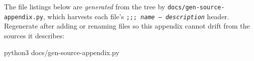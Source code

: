 \begin{remark}
The file listings below are \emph{generated} from the tree by
\texttt{docs/gen-source-appendix.py}, which harvests each file's
\texttt{;;;\ \textit{name} -- \textit{description}} header.  Regenerate after
adding or renaming files so this appendix cannot drift from the sources it
describes:
\begin{VNBsnip}
python3 docs/gen-source-appendix.py
\end{VNBsnip}
\end{remark}



